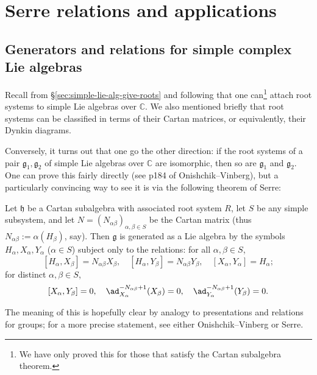 \documentclass[reqno]{amsart} 
\begin{document}
\section{Serre relations and applications}
\label{sec:org96d3081}

\subsection{Generators and relations for simple complex Lie algebras}
\label{sec:orgd6370a3}
Recall from \S\ref{sec:simple-lie-alg-give-roots} and following that one can\footnote{ We have only proved this for those that satisfy the Cartan subalgebra theorem.  } attach root systems to simple Lie algebras over $\mathbb{C}$.  We also mentioned briefly that root systems can be classified in terms of their Cartan matrices, or equivalently, their Dynkin diagrams.

Conversely, it turns out that one go the other direction: if the root systems of a pair $\mathfrak{g}_1, \mathfrak{g}_2$ of simple Lie algebras over $\mathbb{C}$ are isomorphic, then so are $\mathfrak{g}_1$ and $\mathfrak{g}_2$.  One can prove this fairly directly (see p184 of Onishchik--Vinberg), but a particularly convincing way to see it is via the following theorem of Serre:
\begin{theorem}\label{thm:serre-relations}
  Let $\mathfrak{h}$ be a Cartan subalgebra with associated root system $R$, let $S$ be any simple subsystem, and let $N = (N_{\alpha \beta})_{\alpha,\beta \in S}$ be the Cartan matrix (thus $N_{\alpha \beta} := \alpha(H_\beta)$, say).  Then $\mathfrak{g}$ is generated as a Lie algebra by the symbols $H_\alpha, X_\alpha, Y_\alpha$ ($\alpha \in S$) subject only to the relations: for all $\alpha,\beta \in S$,
  \begin{equation*}
    {} [H_\alpha,X_\beta] = N_{\alpha \beta} X_\beta, \quad [H_\alpha,Y_\beta] = N_{\alpha \beta} Y_\beta, \quad [X_\alpha,Y_\alpha] = H_\alpha;
  \end{equation*}
  for distinct $\alpha,\beta \in S$,
  \begin{equation*}
    {} [X_\alpha,Y_\beta] = 0, \quad \ad_{X_\alpha}^{-N_{\alpha \beta}+1}(X_\beta) = 0, \quad \ad_{Y_\alpha}^{-N_{\alpha \beta}+1}(Y_\beta) = 0.
  \end{equation*}
\end{theorem}
The meaning of this is hopefully clear by analogy to presentations and relations for groups; for a more precise statement, see either Onishchik--Vinberg or Serre.
\end{document}
